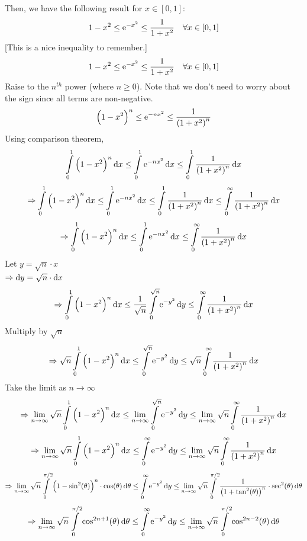 \documentclass[14]{article}
\theoremstyle{definition}
\theoremstyle{case}
\begin{document}
Then, we have the following result for $x \in [0, 1]$:
\[1-x^2 \leq {\rm e}^{-x^2} \leq \dfrac1{1+x^2} \quad \forall x \in [0, 1]\]
[This is a nice inequality to remember.]
\pagebreak
\[1-x^2 \leq {\rm e}^{-x^2} \leq \dfrac1{1+x^2} \quad \forall x \in [0, 1]\]
Raise to the $n^{th}$ power (where $n \geq 0$). Note that we don't need to worry about the sign since all terms are non-negative.
\[\left(1-x^2\right)^n \leq {\rm e}^{-nx^2} \leq \dfrac1{\left( 1+x^2 \right)^n}\]
Using comparison theorem,
\[\int\limits_0^1 \left(1-x^2\right)^n \dif x \leq \int\limits_0^1 {\rm e}^{-nx^2} \dif x \leq \int\limits_0^1 \dfrac1{\left( 1+x^2\right)^n} \dif x \]
\[\Rightarrow\int\limits_0^1 \left(1-x^2\right)^n \dif x \leq \int\limits_0^1 {\rm e}^{-nx^2} \dif x \leq \int\limits_0^1 \dfrac1{\left( 1+x^2\right)^n} \dif x \leq \int\limits_0^{\infty} \dfrac1{\left( 1+x^2 \right)^n} \dif x \]
\[\Rightarrow\int\limits_0^1 \left(1-x^2\right)^n \dif x \leq \int\limits_0^1 {\rm e}^{-nx^2} \dif x \leq \int\limits_0^{\infty} \dfrac1{\left( 1+x^2 \right)^n} \dif x \]
Let $y = \sqrt{n} \cdot x$\\
$\Rightarrow \dif y = \sqrt{n} \cdot \dif x$\\
\[\Rightarrow\int\limits_0^1 \left(1-x^2\right)^n \dif x \leq \dfrac1{\sqrt{n}}\int\limits_0^{\sqrt{n}} {\rm e}^{-y^2} \dif y \leq \int\limits_0^{\infty} \dfrac1{\left( 1+x^2 \right)^n} \dif x \]
Multiply by $\sqrt{n}$\\
\[\Rightarrow \sqrt{n}\int\limits_0^1 \left(1-x^2\right)^n \dif x \leq \int\limits_0^{\sqrt{n}} {\rm e}^{-y^2} \dif y \leq \sqrt{n} \int\limits_0^{\infty} \dfrac1{\left( 1+x^2 \right)^n} \dif x\]
Take the limit as $n \to \infty$
\[\Rightarrow \lim\limits_{n \to \infty} \sqrt{n}\int\limits_0^1 \left(1-x^2\right)^n \dif x \leq \lim\limits_{n \to \infty} \int\limits_0^{\sqrt{n}} {\rm e}^{-y^2} \dif y \leq \lim\limits_{n \to \infty} \sqrt{n} \int\limits_0^{\infty} \dfrac1{\left( 1+x^2 \right)^n} \dif x \]
\[\Rightarrow \lim\limits_{n \to \infty} \sqrt{n}\int\limits_0^1 \left(1-x^2\right)^n \dif x \leq \int\limits_0^{\infty} {\rm e}^{-y^2} \dif y \leq \lim\limits_{n \to \infty} \sqrt{n} \int\limits_0^{\infty} \dfrac1{\left( 1+x^2 \right)^n} \dif x \]
\[\Rightarrow \lim\limits_{n \to \infty} \sqrt{n}\int\limits_0^{\pi/2} \left(1-\sin^2(\theta)\right)^n \cdot \cos(\theta) \dif \theta \leq \int\limits_0^{\infty} {\rm e}^{-y^2} \dif y \leq \lim\limits_{n \to \infty} \sqrt{n} \int\limits_0^{\pi/2} \dfrac1{\left( 1+\tan^2(\theta) \right)^n} \cdot \sec^2(\theta) \dif \theta \]
\[\Rightarrow \lim\limits_{n \to \infty} \sqrt{n}\int\limits_0^{\pi/2} \cos^{2n+1}(\theta) \dif \theta \leq \int\limits_0^{\infty} {\rm e}^{-y^2} \dif y \leq \lim\limits_{n \to \infty} \sqrt{n} \int\limits_0^{\pi/2} \cos^{2n-2}(\theta) \dif \theta \]
\end{document}
